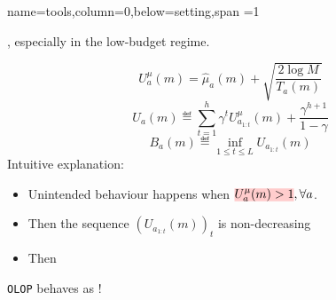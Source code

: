 \documentclass[a0paper,portrait,fontscale=0.35, margin=2cm]{baposter}
\begin{document}
\begin{poster}
{}

{name=tools,column=0,below=setting,span =1}
{

, especially in the low-budget regime.

\begin{equation}
         U^{\mu}_a(m) = \hat{\mu}_a(m) + \sqrt{\frac{2 \log M}{T_a(m)}}
    \end{equation}
    \begin{equation}
    \label{eq:Ua}
        U_a(m) \eqdef \sum_{t = 1}^h \gamma^t U^{\mu}_{a_{1:t}}(m) + \frac{\gamma^{h+1}}{1-\gamma}
    \end{equation}
    \begin{equation}
    \label{eq:Ba}
        B_a(m) \eqdef \inf_{1 \leq t \leq L} U_{a_{1:t}}(m)
    \end{equation}
    Intuitive explanation: 
    \begin{itemize}
        \item Unintended behaviour happens when $\hler{U^{\mu}_a(m) > 1}, \forall a$. 
        \item Then the sequence $(U_{a_{1:t}}(m))_t$ is non-decreasing
        \item Then 
    \end{itemize}

\begin{center}
    
\end{center}

\begin{center}
\texttt{OLOP} behaves as !    
\end{center}
}


\end{poster}
\end{document}

